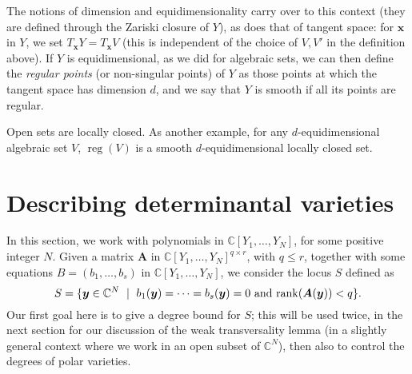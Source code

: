\documentclass[12pt]{article}
\def\X{S}
\def\A{\mathfrak{A}}
\def\Xb{\textit{\textbf{X}}}
\def\xb{{\bm x}}
\def\yb{{\bm y}}
\DeclareMathOperator{\reg}{reg}
\def\C{\mathbb{C}}
\begin{document}
The notions of dimension and equidimensionality carry over to this
context (they are defined through the Zariski closure of $Y$), as does
that of tangent space: for $\xb$ in $Y$, we set $T_\xb Y = T_\xb V$
(this is independent of the choice of $V,V'$ in the definition above).
If $Y$ is equidimensional, as we did for algebraic sets, we can then
define the {\em regular points} (or non-singular points) of $Y$ as
those points at which the tangent space has dimension $d$, and we say
that $Y$ is smooth if all its points are regular.

Open sets are locally closed. As another example, for any
$d$-equidimensional algebraic set $V$, $\reg(V)$ is a smooth
$d$-equidimensional locally closed set.



\section{Describing determinantal varieties}\label{ssec:detvar}

In this section, we work with polynomials in $\C[Y_1,\dots,Y_N]$, for
some positive integer $N$. Given a matrix $\bm A$ in
$\C[Y_1,\dots,Y_N]^{q \times r}$, with $q \le r$, together with some
equations $B=(b_1,\dots,b_s)$ in $\C[Y_1,\dots,Y_N]$, we consider the
locus $\X$ defined as 
\[\X = \{\yb \in \C^N \ \mid \ b_1(\yb) = \cdots = b_s(\yb) =0 
     \text{~and~} {\rm rank}(\bm A(\yb)) < q\}.\]
Our first goal here is to give a degree bound for $\X$; this will be
used twice, in the next section for our discussion of the weak
transversality lemma (in a slightly general context where we work in
an open subset of $\C^N$), then also to control the degrees of polar
varieties.
\end{document}
